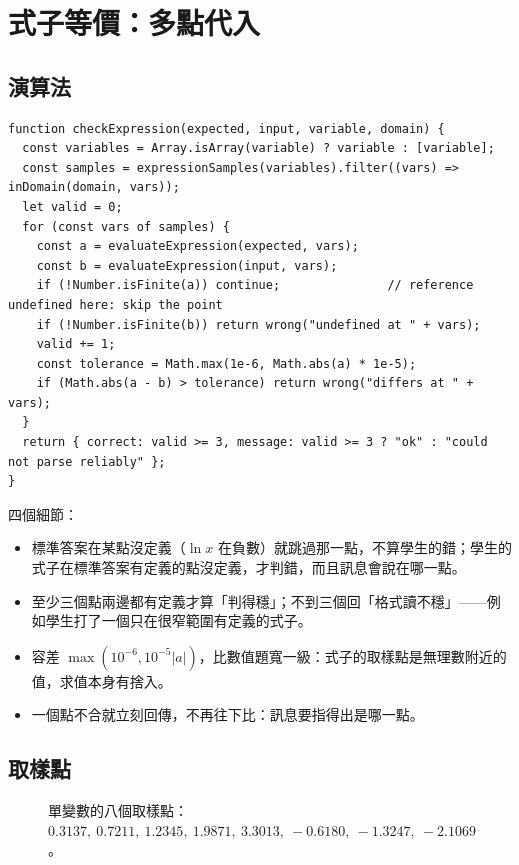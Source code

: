 \documentclass[11pt,a4paper,oneside]{book}
\renewcommand{\_}{\ifmmode\origunderscore\else\textunderscore\allowbreak\fi}
\begin{document}
\chapter{式子等價：多點代入}
\section{演算法}
\begin{lstlisting}
function checkExpression(expected, input, variable, domain) {
  const variables = Array.isArray(variable) ? variable : [variable];
  const samples = expressionSamples(variables).filter((vars) => inDomain(domain, vars));
  let valid = 0;
  for (const vars of samples) {
    const a = evaluateExpression(expected, vars);
    const b = evaluateExpression(input, vars);
    if (!Number.isFinite(a)) continue;               // reference undefined here: skip the point
    if (!Number.isFinite(b)) return wrong("undefined at " + vars);
    valid += 1;
    const tolerance = Math.max(1e-6, Math.abs(a) * 1e-5);
    if (Math.abs(a - b) > tolerance) return wrong("differs at " + vars);
  }
  return { correct: valid >= 3, message: valid >= 3 ? "ok" : "could not parse reliably" };
}
\end{lstlisting}
四個細節：
\begin{itemize}
  \item 標準答案在某點沒定義（$\ln x$ 在負數）就跳過那一點，不算學生的錯；學生的式子在標準答案有定義的點沒定義，才判錯，而且訊息會說在哪一點。
  \item 至少三個點兩邊都有定義才算「判得穩」；不到三個回「格式讀不穩」——例如學生打了一個只在很窄範圍有定義的式子。
  \item 容差 $\max(10^{-6}, 10^{-5}|a|)$，比數值題寬一級：式子的取樣點是無理數附近的值，求值本身有捨入。
  \item 一個點不合就立刻回傳，不再往下比：訊息要指得出是哪一點。
\end{itemize}

\section{取樣點}
\begin{figure}[h]
\centering
{}
\caption{單變數的八個取樣點：$0.3137,\ 0.7211,\ 1.2345,\ 1.9871,\ 3.3013,\ -0.6180,\ -1.3247,\ -2.1069$。}
\end{figure}
\end{document}
